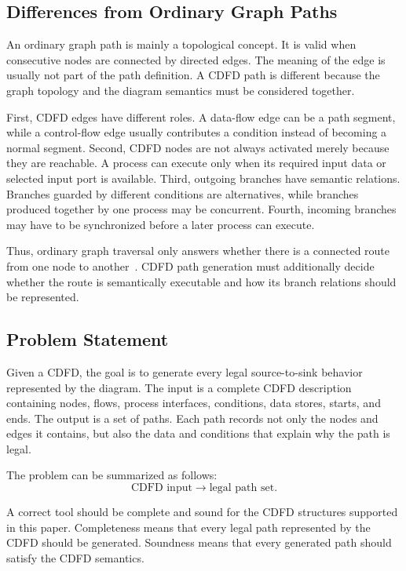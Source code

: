 \documentclass[conference]{template/IEEEtran}
\begin{document}
\subsection{Differences from Ordinary Graph Paths}

An ordinary graph path is mainly a topological concept. It is valid when consecutive nodes are connected by directed edges. The meaning of the edge is usually not part of the path definition. A CDFD path is different because the graph topology and the diagram semantics must be considered together.

First, CDFD edges have different roles. A data-flow edge can be a path segment, while a control-flow edge usually contributes a condition instead of becoming a normal segment. Second, CDFD nodes are not always activated merely because they are reachable. A process can execute only when its required input data or selected input port is available. Third, outgoing branches have semantic relations. Branches guarded by different conditions are alternatives, while branches produced together by one process may be concurrent. Fourth, incoming branches may have to be synchronized before a later process can execute.

Thus, ordinary graph traversal only answers whether there is a connected route from one node to another~\cite{cormen2022introduction}. CDFD path generation must additionally decide whether the route is semantically executable and how its branch relations should be represented.

\subsection{Problem Statement}

Given a CDFD, the goal is to generate every legal source-to-sink behavior represented by the diagram. The input is a complete CDFD description containing nodes, flows, process interfaces, conditions, data stores, starts, and ends. The output is a set of paths. Each path records not only the nodes and edges it contains, but also the data and conditions that explain why the path is legal.

The problem can be summarized as follows:
\begin{equation}
\text{CDFD input} \rightarrow \text{legal path set}.
\end{equation}

A correct tool should be complete and sound for the CDFD structures supported in this paper. Completeness means that every legal path represented by the CDFD should be generated. Soundness means that every generated path should satisfy the CDFD semantics.
\end{document}
